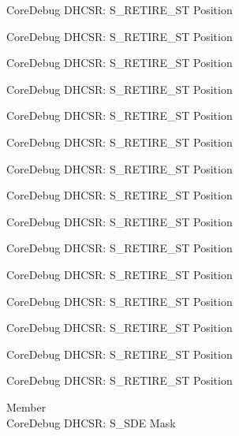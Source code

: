 \begin{DoxyRefList}
\label{deprecated__deprecated000111}%
%
Core\+Debug DHCSR\+: S\+\_\+\+RETIRE\+\_\+\+ST Position 

\label{deprecated__deprecated000165}%
%
Core\+Debug DHCSR\+: S\+\_\+\+RETIRE\+\_\+\+ST Position 

\label{deprecated__deprecated000250}%
%
Core\+Debug DHCSR\+: S\+\_\+\+RETIRE\+\_\+\+ST Position 

\label{deprecated__deprecated000307}%
%
Core\+Debug DHCSR\+: S\+\_\+\+RETIRE\+\_\+\+ST Position 

\label{deprecated__deprecated000383}%
%
Core\+Debug DHCSR\+: S\+\_\+\+RETIRE\+\_\+\+ST Position 

\label{deprecated__deprecated000462}%
%
Core\+Debug DHCSR\+: S\+\_\+\+RETIRE\+\_\+\+ST Position 

\label{deprecated__deprecated000564}%
%
Core\+Debug DHCSR\+: S\+\_\+\+RETIRE\+\_\+\+ST Position 

\label{deprecated__deprecated000670}%
%
Core\+Debug DHCSR\+: S\+\_\+\+RETIRE\+\_\+\+ST Position 

\label{deprecated__deprecated000770}%
%
Core\+Debug DHCSR\+: S\+\_\+\+RETIRE\+\_\+\+ST Position 

\label{deprecated__deprecated000824}%
%
Core\+Debug DHCSR\+: S\+\_\+\+RETIRE\+\_\+\+ST Position 

\label{deprecated__deprecated000909}%
%
Core\+Debug DHCSR\+: S\+\_\+\+RETIRE\+\_\+\+ST Position 

\label{deprecated__deprecated000966}%
%
Core\+Debug DHCSR\+: S\+\_\+\+RETIRE\+\_\+\+ST Position 

\label{deprecated__deprecated001042}%
%
Core\+Debug DHCSR\+: S\+\_\+\+RETIRE\+\_\+\+ST Position 

\label{deprecated__deprecated001121}%
%
Core\+Debug DHCSR\+: S\+\_\+\+RETIRE\+\_\+\+ST Position 

\label{deprecated__deprecated001223}%
%
Core\+Debug DHCSR\+: S\+\_\+\+RETIRE\+\_\+\+ST Position  
\item[Member \doxylink{group___c_m_s_i_s___s_c_b_ga67f2b2b6729ab2db89f97bbe75224e9d}{Core\+Debug\+\_\+\+DHCSR\+\_\+\+S\+\_\+\+SDE\+\_\+\+Msk} ]\hfill \\
\label{deprecated__deprecated000020}%
%
Core\+Debug DHCSR\+: S\+\_\+\+SDE Mask 


\end{DoxyRefList}
